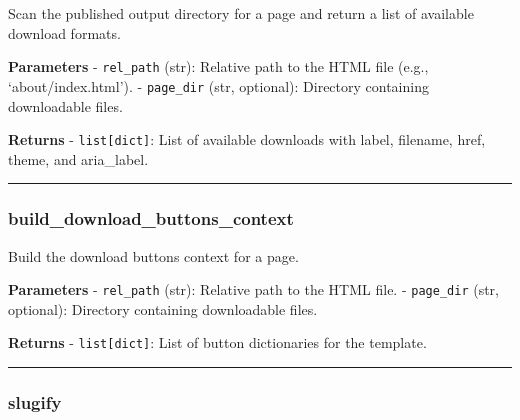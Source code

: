 \begin{Shaded}
\begin{Highlighting}[]
\OperatorTok{=}\NormalTok{)}
\end{Highlighting}
\end{Shaded}

Scan the published output directory for a page and return a list of
available download formats.

\textbf{Parameters} - \texttt{rel\_path} (str): Relative path to the
HTML file (e.g., `about/index.html'). - \texttt{page\_dir} (str,
optional): Directory containing downloadable files.

\textbf{Returns} - \texttt{list{[}dict{]}}: List of available downloads
with label, filename, href, theme, and aria\_label.

\begin{center}\rule{0.5\linewidth}{0.5pt}\end{center}

\subsubsection{build\_download\_buttons\_context}\label{build_download_buttons_context}

\begin{Shaded}
\begin{Highlighting}[]
\OperatorTok{=}\NormalTok{)}
\end{Highlighting}
\end{Shaded}

Build the download buttons context for a page.

\textbf{Parameters} - \texttt{rel\_path} (str): Relative path to the
HTML file. - \texttt{page\_dir} (str, optional): Directory containing
downloadable files.

\textbf{Returns} - \texttt{list{[}dict{]}}: List of button dictionaries
for the template.

\begin{center}\rule{0.5\linewidth}{0.5pt}\end{center}

\subsubsection{slugify}\label{slugify}


